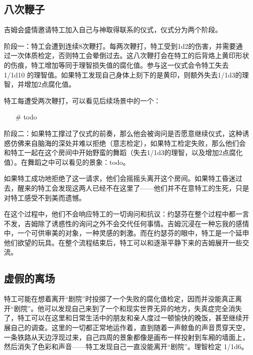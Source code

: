 \subsection{八次鞭子}

吉姆会盛情邀请特工加入自己与神取得联系的仪式，仪式分为两个阶段。

阶段一：特工会遭到连续8次鞭打。每两次鞭打，特工受到1d2的伤害，并需要通过一次体质检定，否则特工会晕倒过去。这八次鞭打会在特工的后背烙上黄印形状的伤痕，特工增加等同于理智损失值的腐化值。参与这一仪式会令特工失去 1/1d10 的理智值。如果特工发现自己身体上刻下的是黄印，则额外失去1/1d3的理智，并增加2点腐化值。

特工每遭受两次鞭打，可以看见后续场景中的一个：

\begin{itemize}
    \item[\#] todo
\end{itemize}

阶段二：如果特工撑过了仪式的前奏，那么他会被询问是否愿意继续仪式，这种诱惑仿佛来自脑海的深处并难以拒绝（意志检定），如果特工检定失败，那么他们会和特工一起在这个房间中开始野蛮的舞蹈（失去1/1d3的理智，以及增加2点腐化值）。在舞蹈之中可以看见的景象：todo。

如果特工成功地拒绝了这一请求，他们会摇摇头离开这个房间。如果特工昏迷过去，醒来的特工会发现这两人已经不在这里了——他们并不在意特工的生死，只是对特工感受不到美而遗憾。

在这个过程中，他们不会响应特工的一切询问和抗议：约瑟芬在整个过程中都一言不发，吉姆除了诱惑性的询问之外不会交代任何事情。吉姆沉浸在一种忘我的感情中，一个可供审美的对象，一种灵感的刺激。而在约瑟芬的眼中，特工是一个延申他们欲望的玩具。在整个流程结束后，特工可以和逐渐平静下来的吉姆展开一些交流。

\subsection{虚假的离场}

特工可能在想着离开“剧院”时投掷了一个失败的腐化值检定，因而并没能真正离开“剧院”。他可以发现自己来到了一个和现实世界无异的地方，失真症完全消失了，特工可以在这里和日常生活中的朋友和亲人度过一顿愉快的晚饭，甚至继续开展自己的调查。这里的一切都正常地运作着，直到随着一声鲸鱼的声音贯穿天空，一条铁路从天边浮现过来，自己四周的景象都像是画布一样投射到车厢的墙面上，然后消失了色彩和声音——特工发现自己一直没能离开“剧院”。理智检定 1/1d6。